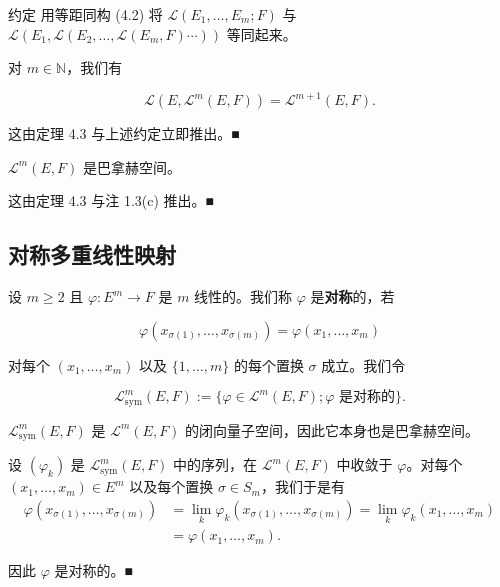 约定 用等距同构 (4.2) 将 $ \mathcal{L}(E_1, \ldots, E_m; F) $ 与 $ \mathcal{L}(E_1, \mathcal{L}(E_2, \ldots, \mathcal{L}(E_m, F) \cdots)) $ 等同起来。

\begin{conclusion}

\begin{items}
\item

对 $ m \in \mathbb{N} $，我们有

\[
\mathcal{L}(E, \mathcal{L}^m(E, F)) = \mathcal{L}^{m+1}(E, F) .
\]

\proofhead
这由定理 4.3 与上述约定立即推出。\nobreak\hspace{0.35em}■
\item

$ \mathcal{L}^m(E, F) $ 是巴拿赫空间。

\proofhead
这由定理 4.3 与注 1.3(c) 推出。\nobreak\hspace{0.35em}■
\end{items}

\end{conclusion}

\subsection*{对称多重线性映射}

设 $ m \ge 2 $ 且 $ \varphi : E^m \to F $ 是 $ m $ 线性的。我们称 $ \varphi $ 是\textbf{对称}的，若

\[
\varphi(x_{\sigma(1)}, \ldots, x_{\sigma(m)}) = \varphi(x_1, \ldots, x_m)
\]

对每个 $ (x_1, \ldots, x_m) $ 以及 $ \{1, \ldots, m\} $ 的每个置换 $ \sigma $ 成立。我们令

\[
\mathcal{L}_{\mathrm{sym}}^m(E, F) := \{ \varphi \in \mathcal{L}^m(E, F) ; \varphi \text{ 是对称的} \} .
\]

\begin{proposition}

$ \mathcal{L}_{\mathrm{sym}}^m(E, F) $ 是 $ \mathcal{L}^m(E, F) $ 的闭向量子空间，因此它本身也是巴拿赫空间。

\proofhead
设 $ (\varphi_k) $ 是 $ \mathcal{L}_{\mathrm{sym}}^m(E, F) $ 中的序列，在 $ \mathcal{L}^m(E, F) $ 中收敛于 $ \varphi $。对每个 $ (x_1, \ldots, x_m) \in E^m $ 以及每个置换 $ \sigma \in S_m $，我们于是有
\begin{equation*}
\begin{aligned}
\varphi(x_{\sigma(1)}, \ldots, x_{\sigma(m)}) &= \lim_k \varphi_k(x_{\sigma(1)}, \ldots, x_{\sigma(m)}) = \lim_k \varphi_k(x_1, \ldots, x_m) \\ &= \varphi(x_1, \ldots, x_m) .
\end{aligned}
\end{equation*}

因此 $ \varphi $ 是对称的。\nobreak\hspace{0.35em}■

\end{proposition}

